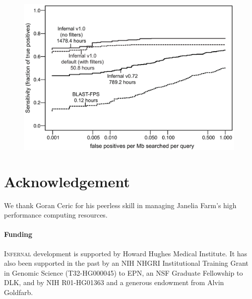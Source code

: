 \documentclass{bioinfo}
\begin{document}
\begin{application}
\begin{figure}[!tpb]
\centerline{\includegraphics[scale=0.33]{figs/roc}}

\label{Fig:01}
\end{figure}

\section*{Acknowledgement}

We thank Goran Ceric for his peerless skill in managing Janelia Farm's
high performance computing resources.

\paragraph{Funding\textcolon} 
\textsc{Infernal} development is supported by Howard Hughes Medical
Institute. It has also been supported in the past by an NIH NHGRI
Institutional Training Grant in Genomic Science (T32-HG000045) to EPN,
an NSF Graduate Fellowship to DLK, and by NIH R01-HG01363 and a
generous endowment from Alvin Goldfarb. 

%
%

%


\end{application}
\end{document}
